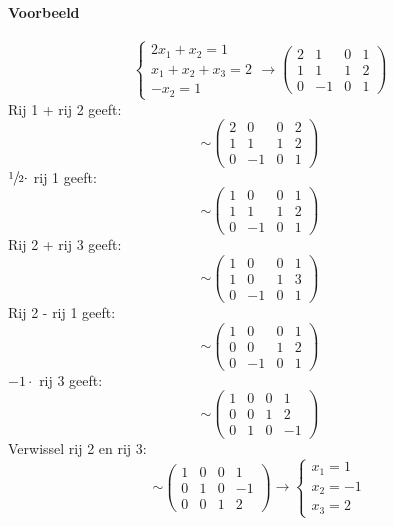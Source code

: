 \paragraph{Voorbeeld}
\[ \left\{ \begin{array}{r}
	2x_1 + x_2 = 1 \\
	x_1 + x_2 + x_3 = 2 \\
	-x_2 = 1
\end{array} \right. \to \left(\! \begin{array}{rrr|r}
	2 & 1 & 0 & 1 \\
	1 & 1 & 1 & 2 \\
	0 & -1 & 0 & 1
\end{array} \!\right) \]
Rij 1 + rij 2 geeft:
\[ \sim \left(\! \begin{array}{rrr|r}
	2 & 0 & 0 & 2 \\
	1 & 1 & 1 & 2 \\
	0 & -1 & 0 & 1
\end{array} \!\right) \]
$ \sfrac{1}{2} \cdot $ rij 1 geeft:
\[ \sim \left(\! \begin{array}{rrr|r}
	1 & 0 & 0 & 1 \\
	1 & 1 & 1 & 2 \\
	0 & -1 & 0 & 1
\end{array} \!\right) \]
Rij 2 + rij 3 geeft:
\[ \sim \left(\! \begin{array}{rrr|r}
	1 & 0 & 0 & 1 \\
	1 & 0 & 1 & 3 \\
	0 & -1 & 0 & 1
\end{array} \!\right) \]
Rij 2 - rij 1 geeft:
\[ \sim \left(\! \begin{array}{rrr|r}
	1 & 0 & 0 & 1 \\
	0 & 0 & 1 & 2 \\
	0 & -1 & 0 & 1
\end{array} \!\right) \]
$-1 \cdot$ rij 3 geeft:
\[ \sim \left(\! \begin{array}{rrr|r}
	1 & 0 & 0 & 1 \\
	0 & 0 & 1 & 2 \\
	0 & 1 & 0 & -1
\end{array} \!\right) \]
Verwissel rij 2 en rij 3:
\[ \sim \left(\! \begin{array}{rrr|r}
	1 & 0 & 0 & 1 \\
	0 & 1 & 0 & -1 \\
	0 & 0 & 1 & 2
\end{array} \!\right) \to \left\{ \begin{array}{l}
	x_1 = 1 \\
	x_2 = -1 \\
	x_3 = 2
\end{array} \right. \]

